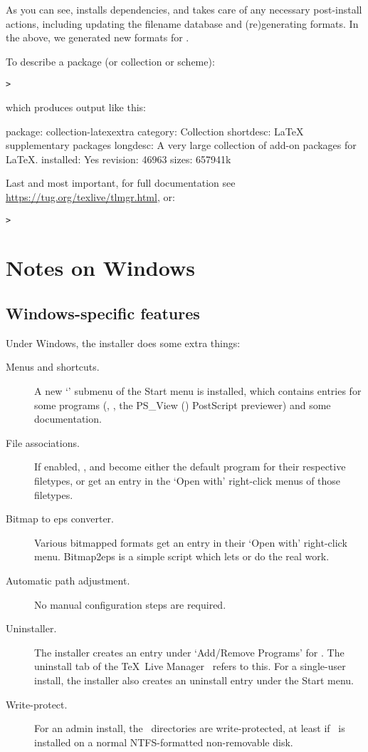 \documentclass{article}
\begin{document}
As you can see,  installs dependencies, and takes care of any
necessary post-install actions, including updating the filename database
and (re)generating formats.  In the above, we generated new formats for
\XeTeX.

To describe a package (or collection or scheme):
\begin{alltt}
> 
\end{alltt}
which produces output like this:
\begin{fverbatim}
package:    collection-latexextra
category:   Collection
shortdesc:  LaTeX supplementary packages
longdesc:   A very large collection of add-on packages for LaTeX.
installed:  Yes
revision:   46963
sizes:      657941k
\end{fverbatim}

Last and most important, for full documentation see
\url{https://tug.org/texlive/tlmgr.html}, or:
\begin{alltt}
> 
\end{alltt}


\section{Notes on Windows}
\label{sec:windows}

\subsection{Windows-specific features}
\label{sec:winfeatures}

Under Windows, the installer does some extra things:
\begin{description}
\item[Menus and shortcuts.] A new `\TL{}' submenu of the
  Start menu is installed, which contains entries for some \GUI{}
  programs (, , the PS\_View ()
  PostScript previewer) and some documentation.
\item[File associations.] If enabled, , 
  and  become either the default program for
  their respective filetypes, or get an entry in the `Open with'
  right-click menus of those filetypes.
\item[Bitmap to eps converter.] Various bitmapped formats get an
  entry  in their `Open with' right-click
  menu. Bitmap2eps is a simple script which lets  or
   do the real work.
\item[Automatic path adjustment.] No manual configuration steps are required.
\item[Uninstaller.] The installer creates an entry under `Add/Remove
  Programs' for \TL. The uninstall tab of the \TeX\ Live Manager \GUI\
  refers to this. For a single-user install, the installer also
  creates an uninstall entry under the Start menu.
\item[Write-protect.] For an admin install, the \TL\ directories are
  write-protected, at least if \TL\ is installed on a normal
  NTFS-formatted non-removable disk.
\end{description}
\end{document}
